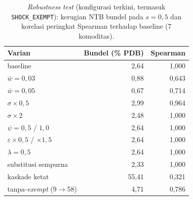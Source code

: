 \documentclass[11pt,a4paper]{article}
\newcommand{\en}[1]{\textit{#1}}   %
\begin{document}
\begin{table}[ht]
\centering\small
\caption{\en{Robustness test} (konfigurasi terkini, termasuk
\texttt{SHOCK\_EXEMPT}): kerugian NTB bundel pada $s = 0{,}5$ dan
korelasi peringkat Spearman terhadap baseline (7 komoditas).}
\label{tab:robust}
\begin{tabular}{@{}lrr@{}}
\toprule
Varian & Bundel (\% PDB) & Spearman \\
\midrule
baseline               & 2{,}64  & 1{,}000 \\
$\bar w = 0{,}03$      & 0{,}88  & 0{,}643 \\
$\bar w = 0{,}05$      & 0{,}67  & 0{,}714 \\
$\sigma \times 0{,}5$  & 2{,}99  & 0{,}964 \\
$\sigma \times 2$      & 2{,}48  & 1{,}000 \\
$\psi = 0{,}5$ / $1{,}0$ & 2{,}64 & 1{,}000 \\
$\varepsilon \times 0{,}5$ / $\times 1{,}5$ & 2{,}64 & 1{,}000 \\
$\lambda = 0{,}5$      & 2{,}64  & 1{,}000 \\
substitusi sempurna    & 2{,}33  & 1{,}000 \\
kaskade ketat          & 55{,}41 & 0{,}321 \\
tanpa-\en{exempt} (9$\to$58) & 4{,}71 & 0{,}786 \\
\bottomrule
\end{tabular}
\end{table}
\end{document}
